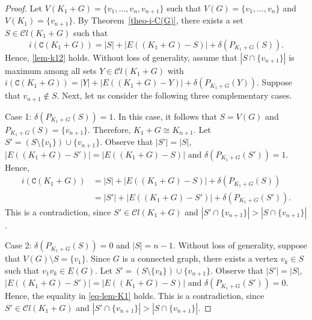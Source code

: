 \documentclass[12pt]{article}
\begin{document}
\begin{proof}
Let $V(K_1+G)=\{v_1,\ldots,v_n,v_{n+1}\}$ such that $V(G)=\{v_1,\ldots,v_n\}$ and $V(K_1) = \{v_{n+1}\}$. 
By Theorem~\ref{theo-i-C(G)}, there exists a set $S \in \mathcal{C}l(K_1+G)$ such that 
\begin{equation*}
i(\mathtt{C}(K_1+G)) = |S| + |E((K_1+G)-S)| + \delta(P_{K_1+G}(S)).
\end{equation*}
Hence, \ref{lem-k12} holds. Without loss of generality, assume that $|S\cap \{v_{n+1}\}|$ is maximum among all sets $Y \in \mathcal{C}l(K_1+G)$ with $i(\mathtt{C}(K_1+G)) = |Y| + |E((K_1+G)-Y)| + \delta(P_{K_1+G}(Y))$. Suppose that $v_{n+1} \notin S$.
Next, let us consider the following three complementary cases.

\vspace{.2cm}

\noindent
Case 1: $\delta(P_{K_1+G}(S))=1$. In this case, it follows that $S=V(G)$ and $P_{K_1+G}(S)=\{v_{n+1}\}$. Therefore, $K_1+G\cong K_{n+1}$.  Let $S'=(S\setminus \{v_1\}) \cup \{v_{n+1}\}$. Observe that $|S'|=|S|$, $|E((K_1+G)-S')|=|E((K_1+G)-S)|$ and $\delta(P_{K_1+G}(S'))=1$. Hence, 
\begin{equation}\label{eq-lem-K1}
\begin{split}
i(\mathtt{C}(K_1+G)) &= |S| + |E((K_1+G)-S)| + \delta(P_{K_1+G}(S))\\[4pt]
&=|S'| + |E((K_1+G)-S')| + \delta(P_{K_1+G}(S')).
\end{split}
\end{equation}
This is a contradiction, since $S'\in \mathcal{C}l(K_1+G)$ and $|S'\cap \{v_{n+1}\}| > |S\cap \{v_{n+1}\}|$.  

\vspace{.25cm}

\noindent
Case 2: $\delta(P_{K_1+G}(S))=0$ and $|S| = n-1$. Without loss of generality, suppose that $V(G)\setminus S=\{v_1\}$. Since $G$ is a connected graph, there exists a vertex $v_k \in S$ such that $v_1v_k \in E(G)$. Let $S'=(S\setminus \{v_k\}) \cup \{v_{n+1}\}$. Observe that $|S'|=|S|$, $|E((K_1+G)-S')|=|E((K_1+G)-S)|$ and $\delta(P_{K_1+G}(S'))=0$. Hence, the equality in \eqref{eq-lem-K1} holds. This is a contradiction, since $S'\in \mathcal{C}l(K_1+G)$ and $|S'\cap \{v_{n+1}\}| > |S\cap \{v_{n+1}\}|$.

\vspace{.25cm}


\end{proof}
\end{document}
